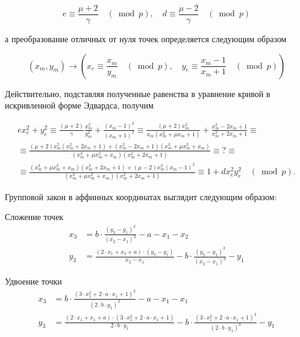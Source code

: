 $$
e \equiv \frac{\mu+2}{\gamma} \quad(\bmod p), \quad d \equiv \frac{\mu-2}{\gamma} \quad(\bmod p)
$$

а преобразование отличных от нуля точек определяется следующим образом

$$
\left(x_{m}, y_{m}\right) \rightarrow\left(x_{e} \equiv \frac{x_{m}}{y_{m}} \quad(\bmod p), \quad y_{e} \equiv \frac{x_{m}-1}{x_{m}+1} \quad(\bmod p)\right)
$$

Действительно, подставляя полученные равенства в уравнение кривой в искривленной форме Эдвардса, получим

$$
\begin{gathered}
e x_{e}^{2}+y_{e}^{2} \equiv \frac{(\mu+2)}{\gamma} \frac{x_{m}^{2}}{y_{m}^{2}}+\frac{\left(x_{m}-1\right)^{2}}{\left(x_{m}+1\right)^{2}} \equiv \frac{(\mu+2) x_{m}^{2}}{x_{m}\left(x_{m}^{2}+\mu x_{m}+1\right)}+\frac{x_{m}^{2}-2 x_{m}+1}{x_{m}^{2}+2 x_{m}+1} \equiv \\
\equiv \frac{(\mu+2) x_{m}^{2}\left(x_{m}^{2}+2 x_{m}+1\right)+\left(x_{m}^{2}-2 x_{m}+1\right)\left(x_{m}^{3}+\mu x_{m}^{2}+x_{m}\right)}{\left(x_{m}^{3}+\mu x_{m}^{2}+x_{m}\right)\left(x_{m}^{2}+2 x_{m}+1\right)} \equiv ? \equiv \\
\equiv \frac{\left(x_{m}^{3}+\mu x_{m}^{2}+x_{m}\right)\left(x_{m}^{2}+2 x_{m}+1\right)+(\mu-2) x_{m}^{2}\left(x_{m}-1\right)^{2}}{\left(x_{m}^{3}+\mu x_{m}^{2}+x_{m}\right)\left(x_{m}^{2}+2 x_{m}+1\right)} \equiv 1+d x_{e}^{2} y_{e}^{2} \quad(\bmod p) .
\end{gathered}
$$

Групповой закон в аффинных координатах выглядит следующим образом:

Сложение точек
\begin{align*}
x_3 &= b \cdot \frac{(y_2 - y_1)^2}{(x_2 - x_1)^2} - a - x_1 - x_2 \\
y_3 &= \frac{(2 \cdot x_1 + x_2 + a) \cdot (y_2 - y_1)}{x_2 - x_1} - b \cdot \frac{(y_2 - y_1)^3}{(x_2 - x_1)^3} - y_1
\end{align*}

Удвоение точки
\begin{align*}
x_3 &= b \cdot \frac{(3 \cdot x_1^2 + 2 \cdot a \cdot x_1 + 1)^2}{(2 \cdot b \cdot y_1)^2} - a - x_1 - x_1 \\
y_3 &= \frac{(2 \cdot x_1 + x_1 + a) \cdot (3 \cdot x_1^2 + 2 \cdot a \cdot x_1 + 1)}{2 \cdot b \cdot y_1} - b \cdot \frac{(3 \cdot x_1^2 + 2 \cdot a \cdot x_1 + 1)^3}{(2 \cdot b \cdot y_1)^3} - y_1
\end{align*}

